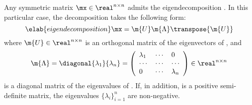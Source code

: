 Any symmetric matrix $\mx \in \real^{n \times n}$ admits the eigendecomposition
\cite{press2007}. In this particular case, the decomposition takes the following
form:
\begin{equation} \elab{eigendecomposition}
  \mx = \m{U} \m{\Lambda} \transpose{\m{U}}
\end{equation}
where $\m{U} \in \real^{n \times n}$ is an orthogonal matrix of the eigenvectors
of \mx, and
\[
  \m{\Lambda} = \diagonal{\lambda_1}{\lambda_n} = \left(
    \begin{array}{lll}
      \lambda_1 & \cdots & 0         \\
      \cdots    & \cdots & \cdots    \\
      0         & \cdots & \lambda_n
    \end{array}
  \right) \in \real^{n \times n}
\]
is a diagonal matrix of the eigenvalues of \mx. If, in addition, \mx is a
positive semi-definite matrix, the eigenvalues $\{ \lambda_i \}_{i = 1}^n$ are
non-negative.
